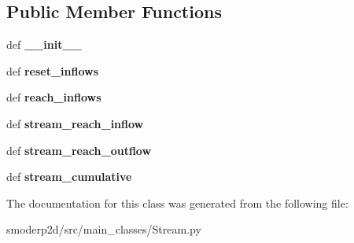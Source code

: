\subsection*{Public Member Functions}
\begin{DoxyCompactItemize}
\item 
\hypertarget{classsmoderp2d_1_1src_1_1main__classes_1_1Stream_1_1StreamPass_a104c4216b1d7131b0eab1f8c16918b79}{def {\bfseries \-\_\-\-\_\-init\-\_\-\-\_\-}}\label{classsmoderp2d_1_1src_1_1main__classes_1_1Stream_1_1StreamPass_a104c4216b1d7131b0eab1f8c16918b79}

\item 
\hypertarget{classsmoderp2d_1_1src_1_1main__classes_1_1Stream_1_1StreamPass_a79fe170e436e449eb6741ad7de78d4fe}{def {\bfseries reset\-\_\-inflows}}\label{classsmoderp2d_1_1src_1_1main__classes_1_1Stream_1_1StreamPass_a79fe170e436e449eb6741ad7de78d4fe}

\item 
\hypertarget{classsmoderp2d_1_1src_1_1main__classes_1_1Stream_1_1StreamPass_a6a3307d529c06df9d0be7d08d663fcac}{def {\bfseries reach\-\_\-inflows}}\label{classsmoderp2d_1_1src_1_1main__classes_1_1Stream_1_1StreamPass_a6a3307d529c06df9d0be7d08d663fcac}

\item 
\hypertarget{classsmoderp2d_1_1src_1_1main__classes_1_1Stream_1_1StreamPass_ab936214091b6251d511615d6144db0b2}{def {\bfseries stream\-\_\-reach\-\_\-inflow}}\label{classsmoderp2d_1_1src_1_1main__classes_1_1Stream_1_1StreamPass_ab936214091b6251d511615d6144db0b2}

\item 
\hypertarget{classsmoderp2d_1_1src_1_1main__classes_1_1Stream_1_1StreamPass_a15968039ec33a1f47b908f2cb0357524}{def {\bfseries stream\-\_\-reach\-\_\-outflow}}\label{classsmoderp2d_1_1src_1_1main__classes_1_1Stream_1_1StreamPass_a15968039ec33a1f47b908f2cb0357524}

\item 
\hypertarget{classsmoderp2d_1_1src_1_1main__classes_1_1Stream_1_1StreamPass_a1a2803c1bd7824c0fcf3d356690d2d29}{def {\bfseries stream\-\_\-cumulative}}\label{classsmoderp2d_1_1src_1_1main__classes_1_1Stream_1_1StreamPass_a1a2803c1bd7824c0fcf3d356690d2d29}

\end{DoxyCompactItemize}


The documentation for this class was generated from the following file\-:\begin{DoxyCompactItemize}
\item 
smoderp2d/src/main\-\_\-classes/Stream.\-py\end{DoxyCompactItemize}
